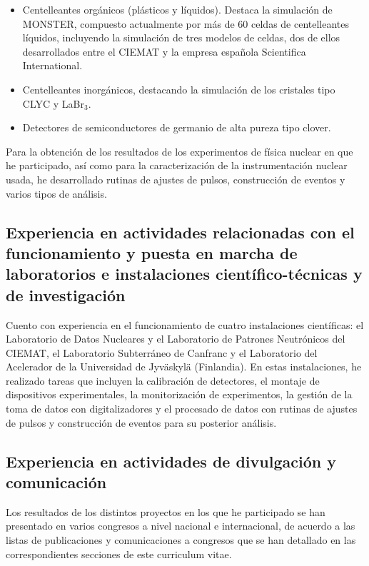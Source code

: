 \documentclass[changecolor={240, 95, 64}]{cv}
\begin{document}
\begin{itemize}
\begin{itemize}
                \begin{itemize}
                  \item Centelleantes orgánicos (plásticos y líquidos). Destaca la simulación de MONSTER, compuesto actualmente por más de 60 celdas de centelleantes líquidos, incluyendo la simulación de tres modelos de celdas, dos de ellos desarrollados entre el CIEMAT y la empresa española Scientifica International.
                  \item Centelleantes inorgánicos, destacando la simulación de los cristales tipo CLYC y LaBr$_3$.
                  \item Detectores de semiconductores de germanio de alta pureza tipo clover.
                \end{itemize}
        \end{itemize}
\end{itemize}

Para la obtención de los resultados de los experimentos de física nuclear en que he participado, así como para la caracterización de la instrumentación nuclear usada, he desarrollado rutinas de ajustes de pulsos, construcción de eventos y varios tipos de análisis.

\subsection*{Experiencia en actividades relacionadas con el funcionamiento y puesta en marcha de laboratorios e instalaciones científico-técnicas y de investigación}

Cuento con experiencia en el funcionamiento de cuatro instalaciones científicas: el Laboratorio de Datos Nucleares y el Laboratorio de Patrones Neutrónicos del CIEMAT, el Laboratorio Subterráneo de Canfranc y el Laboratorio del Acelerador de la Universidad de Jyväskylä (Finlandia). En estas instalaciones, he realizado tareas que incluyen la calibración de detectores, el montaje de dispositivos experimentales, la monitorización de experimentos, la gestión de la toma de datos con digitalizadores y el procesado de datos con rutinas de ajustes de pulsos y construcción de eventos para su posterior análisis.

\subsection*{Experiencia en actividades de divulgación y comunicación}

Los resultados de los distintos proyectos en los que he participado se han presentado en varios congresos a nivel nacional e internacional, de acuerdo a las listas de publicaciones y comunicaciones a congresos que se han detallado en las correspondientes secciones de este curriculum vitae.
\end{document}
